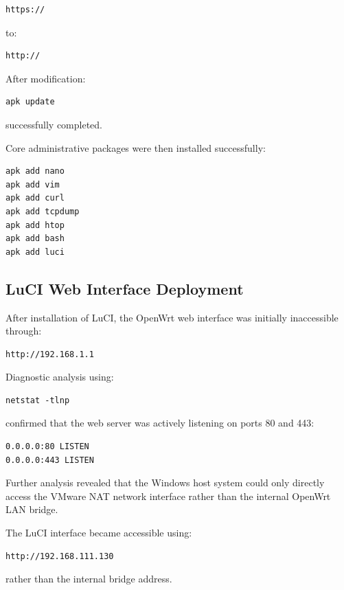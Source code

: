 \documentclass[conference]{IEEEtran}
\begin{document}
\begin{verbatim}
https://
\end{verbatim}

to:

\begin{verbatim}
http://
\end{verbatim}

After modification:

\begin{verbatim}
apk update
\end{verbatim}

successfully completed.

Core administrative packages were then installed successfully:

\begin{verbatim}
apk add nano
apk add vim
apk add curl
apk add tcpdump
apk add htop
apk add bash
apk add luci
\end{verbatim}

\subsection{LuCI Web Interface Deployment}

After installation of LuCI, the OpenWrt web interface was initially inaccessible through:

\begin{verbatim}
http://192.168.1.1
\end{verbatim}

Diagnostic analysis using:

\begin{verbatim}
netstat -tlnp
\end{verbatim}

confirmed that the web server was actively listening on ports 80 and 443:

\begin{verbatim}
0.0.0.0:80 LISTEN
0.0.0.0:443 LISTEN
\end{verbatim}

Further analysis revealed that the Windows host system could only directly access the VMware NAT network interface rather than the internal OpenWrt LAN bridge.

The LuCI interface became accessible using:

\begin{verbatim}
http://192.168.111.130
\end{verbatim}

rather than the internal bridge address.
\end{document}
